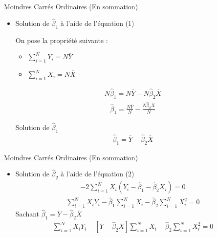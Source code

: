 \documentclass{beamer}
\begin{document}
\begin{frame}{Moindres Carrés Ordinaires (En sommation)}
\begin{itemize}
  \item Solution de \( \hat{\beta}_1 \) à l'aide de l'équation (1)
  
  \vspace{0.5cm}
  On pose la propriété suivante : 
  \begin{itemize}
    \item \( \sum_{i=1}^N Y_i = N \overline{Y} \) 
    \item \( \sum_{i=1}^N X_i = N \overline{X} \)
  \end{itemize}
  \begin{align*}
    N \hat{\beta}_1 = N \overline{Y} - N \hat{\beta}_2 \overline{X}
  \end{align*}
  \begin{align*}
    \hat{\beta}_1 = \frac{N \overline{Y}}{N} - \frac{N \hat{\beta}_2 \overline{X}}{N}
  \end{align*}
  
  \begin{block}{Solution de \( \hat{\beta}_1 \)}
    \begin{align*}
      \hat{\beta}_1 = \overline{Y} - \hat{\beta}_2 \overline{X}
    \end{align*}
  \end{block}
\end{itemize}
\end{frame}

\begin{frame}{Moindres Carrés Ordinaires (En sommation)}
\begin{itemize}
  \item Solution de \( \hat{\beta}_2 \) à l'aide de l'équation (2)
  \begin{align*}
    -2 \sum_{i=1}^N X_i (Y_i - \hat{\beta}_1 - \hat{\beta}_2 X_i) = 0
  \end{align*}
  \begin{align*}
    \sum_{i=1}^N X_i Y_i - \hat{\beta}_1 \sum_{i=1}^N X_i - \hat{\beta}_2 \sum_{i=1}^N X_i^2 = 0
  \end{align*}
  Sachant \( \hat{\beta}_1 = \overline{Y} - \hat{\beta}_2 \overline{X} \)
  \begin{align*}
    \sum_{i=1}^N X_i Y_i - [\overline{Y} - \hat{\beta}_2 \overline{X}] \sum_{i=1}^N X_i - \hat{\beta}_2 \sum_{i=1}^N X_i^2 = 0
  \end{align*}
\end{itemize}
\end{frame}
\end{document}

